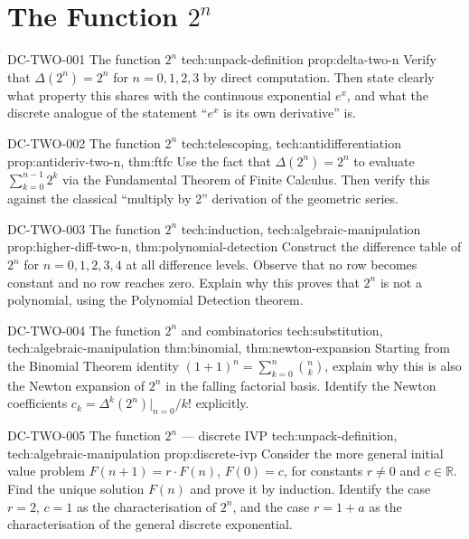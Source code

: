\section*{\texorpdfstring{The Function \(2^n\)}{The Function 2 to the n}}

\exstubgenfull
  {DC-TWO-001}
  {The function $2^n$}
  {tech:unpack-definition}
  {prop:delta-two-n}
  {Verify that \(\Delta(2^n) = 2^n\) for \(n = 0, 1, 2, 3\) by direct
  computation. Then state clearly what property this shares with the
  continuous exponential \(e^x\), and what the discrete analogue of
  the statement ``\(e^x\) is its own derivative'' is.}

\exstubgenfull
  {DC-TWO-002}
  {The function $2^n$}
  {tech:telescoping, tech:antidifferentiation}
  {prop:antideriv-two-n, thm:ftfc}
  {Use the fact that \(\Delta(2^n) = 2^n\) to evaluate
  \(\displaystyle\sum_{k=0}^{n-1} 2^k\) via the Fundamental Theorem
  of Finite Calculus. Then verify this against the classical
  ``multiply by 2'' derivation of the geometric series.}

\exstubgenfull
  {DC-TWO-003}
  {The function $2^n$}
  {tech:induction, tech:algebraic-manipulation}
  {prop:higher-diff-two-n, thm:polynomial-detection}
  {Construct the difference table of \(2^n\) for \(n = 0, 1, 2, 3, 4\)
  at all difference levels. Observe that no row becomes constant and
  no row reaches zero. Explain why this proves that \(2^n\) is not a
  polynomial, using the Polynomial Detection theorem.}

\exstubgenfull
  {DC-TWO-004}
  {The function $2^n$ and combinatorics}
  {tech:substitution, tech:algebraic-manipulation}
  {thm:binomial, thm:newton-expansion}
  {Starting from the Binomial Theorem identity \((1+1)^n = \sum_{k=0}^{n}\binom{n}{k}\),
  explain why this is also the Newton expansion of \(2^n\) in the
  falling factorial basis. Identify the Newton coefficients
  \(c_k = \Delta^k(2^n)\big|_{n=0}/k!\) explicitly.}

\exstubgenfull
  {DC-TWO-005}
  {The function $2^n$ --- discrete IVP}
  {tech:unpack-definition, tech:algebraic-manipulation}
  {prop:discrete-ivp}
  {Consider the more general initial value problem
  \(F(n+1) = r \cdot F(n)\), \(F(0) = c\), for constants \(r \ne 0\)
  and \(c \in \mathbb{R}\). Find the unique solution \(F(n)\) and
  prove it by induction. Identify the case \(r = 2\), \(c = 1\) as
  the characterisation of \(2^n\), and the case \(r = 1+a\) as the
  characterisation of the general discrete exponential.}
